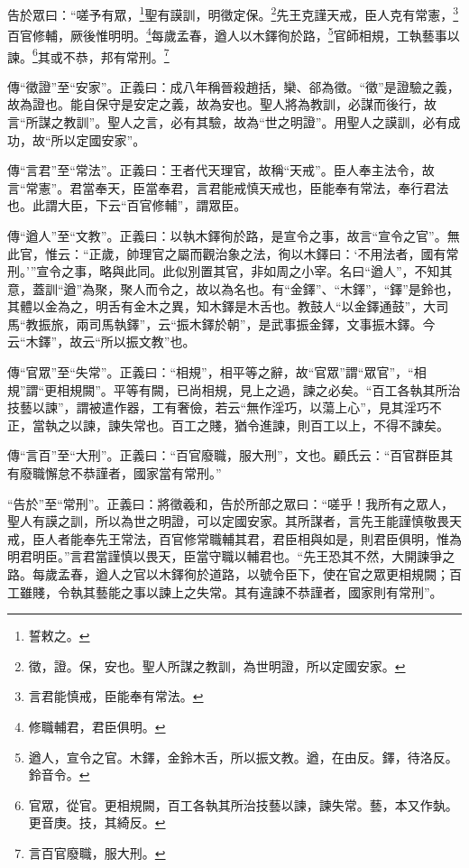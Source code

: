 告於眾曰：“嗟予有眾，\footnote{誓敕之。}聖有謨訓，明徵定保。\footnote{徵，證。保，安也。聖人所謀之教訓，為世明證，所以定國安家。}先王克謹天戒，臣人克有常憲，\footnote{言君能慎戒，臣能奉有常法。}百官修輔，厥後惟明明。\footnote{修職輔君，君臣俱明。}每歲孟春，遒人以木鐸徇於路，\footnote{遒人，宣令之官。木鐸，金鈴木舌，所以振文教。遒，在由反。鐸，待洛反。鈴音令。}官師相規，工執藝事以諫。\footnote{官眾，從官。更相規闕，百工各執其所治技藝以諫，諫失常。藝，本又作埶。更音庚。技，其綺反。}其或不恭，邦有常刑。\footnote{言百官廢職，服大刑。}

{\noindent\zhuan{}\fzbyks 傳“徵證”至“安家”。正義曰：成八年稱晉殺趙括，欒、郤為徵。“徵”是證驗之義，故為證也。能自保守是安定之義，故為安也。聖人將為教訓，必謀而後行，故言“所謀之教訓”。聖人之言，必有其驗，故為“世之明證”。用聖人之謨訓，必有成功，故“所以定國安家”。 \par}

{\noindent\zhuan{}\fzbyks 傳“言君”至“常法”。正義曰：王者代天理官，故稱“天戒”。臣人奉主法令，故言“常憲”。君當奉天，臣當奉君，言君能戒慎天戒也，臣能奉有常法，奉行君法也。此謂大臣，下云“百官修輔”，謂眾臣。 \par}

{\noindent\zhuan{}\fzbyks 傳“遒人”至“文教”。正義曰：以執木鐸徇於路，是宣令之事，故言“宣令之官”。無此官，惟云：“正歲，帥理官之屬而觀治象之法，徇以木鐸曰：‘不用法者，國有常刑。’”宣令之事，略與此同。此似別置其官，非如周之小宰。名曰“遒人”，不知其意，蓋訓“遒”為聚，聚人而令之，故以為名也。有“金鐸”、“木鐸”，“鐸”是鈴也，其體以金為之，明舌有金木之異，知木鐸是木舌也。教鼓人“以金鐸通鼓”，大司馬“教振旅，兩司馬執鐸”，云“振木鐸於朝”，是武事振金鐸，文事振木鐸。今云“木鐸”，故云“所以振文教”也。 \par}

{\noindent\zhuan{}\fzbyks 傳“官眾”至“失常”。正義曰：“相規”，相平等之辭，故“官眾”謂“眾官”，“相規”謂“更相規闕”。平等有闕，已尚相規，見上之過，諫之必矣。“百工各執其所治技藝以諫”，謂被遣作器，工有奢儉，若云“無作淫巧，以蕩上心”，見其淫巧不正，當執之以諫，諫失常也。百工之賤，猶令進諫，則百工以上，不得不諫矣。 \par}

{\noindent\zhuan{}\fzbyks 傳“言百”至“大刑”。正義曰：“百官廢職，服大刑”，文也。顧氏云：“百官群臣其有廢職懈怠不恭謹者，國家當有常刑。” \par}

{\noindent\shu{}\fzkt “告於”至“常刑”。正義曰：將徵羲和，告於所部之眾曰：“嗟乎！我所有之眾人，聖人有謨之訓，所以為世之明證，可以定國安家。其所謀者，言先王能謹慎敬畏天戒，臣人者能奉先王常法，百官修常職輔其君，君臣相與如是，則君臣俱明，惟為明君明臣。”言君當謹慎以畏天，臣當守職以輔君也。“先王恐其不然，大開諫爭之路。每歲孟春，遒人之官以木鐸徇於道路，以號令臣下，使在官之眾更相規闕；百工雖賤，令執其藝能之事以諫上之失常。其有違諫不恭謹者，國家則有常刑”。 \par}

